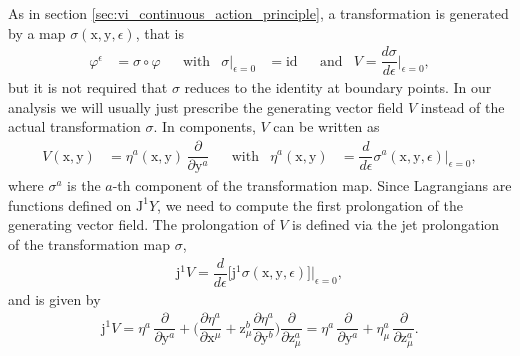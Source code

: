 \documentclass[12pt,a4paper,reqno]{article}
\begin{document}
As in section \ref{sec:vi_continuous_action_principle}, a transformation is generated by a map $\sigma ({\ensuremath{{\ensuremath{\mathrm{{x}}}}}}, {\ensuremath{{\ensuremath{\mathrm{{y}}}}}}, {\ensuremath{\epsilon}})$, that is
\begin{align}\label{eq:noether_continuous_transformation}
{\ensuremath{\varphi}}^{\ensuremath{\epsilon}} &= \sigma \circ {\ensuremath{\varphi}} &
& \text{with} &
\sigma \vert_{{\ensuremath{\epsilon}}=0} &= \mathrm{id} &
& \text{and} &
V = \dfrac{d\sigma}{d{\ensuremath{\epsilon}}} \bigg\vert_{{\ensuremath{\epsilon}}=0} ,
\end{align}
but it is not required that $\sigma$ reduces to the identity at boundary points.
In our analysis we will usually just prescribe the generating vector field $V$ instead of the actual transformation $\sigma$.
In components, $V$ can be written as
\begin{align}\label{eq:noether_continuous_vector_field}
V ({\ensuremath{{\ensuremath{\mathrm{{x}}}}}}, {\ensuremath{{\ensuremath{\mathrm{{y}}}}}}) &= \eta^{a} ({\ensuremath{{\ensuremath{\mathrm{{x}}}}}}, {\ensuremath{{\ensuremath{\mathrm{{y}}}}}}) \, \dfrac{\partial}{\partial {\ensuremath{{\ensuremath{\mathrm{{y}}}}}}^{a}} &
& \text{with} &
\eta^{a} ({\ensuremath{{\ensuremath{\mathrm{{x}}}}}}, {\ensuremath{{\ensuremath{\mathrm{{y}}}}}}) &= \dfrac{d}{d{\ensuremath{\epsilon}}} \sigma^{a} ({\ensuremath{{\ensuremath{\mathrm{{x}}}}}}, {\ensuremath{{\ensuremath{\mathrm{{y}}}}}}, {\ensuremath{\epsilon}}) \bigg\vert_{{\ensuremath{\epsilon}}=0} ,
\end{align}
where $\sigma^{a}$ is the $a$-th component of the transformation map. 
Since Lagrangians are functions defined on ${\ensuremath{\mathrm{J}}}^{1} Y$, we need to compute the first prolongation of the generating vector field.
The prolongation of $V$ is defined via the jet prolongation of the transformation map $\sigma$,
\begin{align}
{\ensuremath{\mathrm{j}}}^{1} V = \dfrac{d}{d{\ensuremath{\epsilon}}} \Big[ {\ensuremath{\mathrm{j}}}^{1} \sigma ({\ensuremath{{\ensuremath{\mathrm{{x}}}}}}, {\ensuremath{{\ensuremath{\mathrm{{y}}}}}}, {\ensuremath{\epsilon}}) \Big] \bigg\vert_{{\ensuremath{\epsilon}}=0} ,
\end{align}
and is given by
\begin{align}\label{eq:noether_continuous_vector_field_prolongation}
{\ensuremath{\mathrm{j}}}^{1} V
= \eta^{a} \, \dfrac{\partial}{\partial {\ensuremath{{\ensuremath{\mathrm{{y}}}}}}^{a}} + \bigg( \dfrac{\partial \eta^{a}}{\partial {\ensuremath{{\ensuremath{\mathrm{{x}}}}}}^{\mu}} + {\ensuremath{{\ensuremath{\mathrm{{z}}}}}}^{b}_{\mu} \dfrac{\partial \eta^{a}}{\partial {\ensuremath{{\ensuremath{\mathrm{{y}}}}}}^{b}} \bigg) \dfrac{\partial}{\partial {\ensuremath{{\ensuremath{\mathrm{{z}}}}}}^{a}_{\mu}}
= \eta^{a} \, \dfrac{\partial}{\partial {\ensuremath{{\ensuremath{\mathrm{{y}}}}}}^{a}} + \eta^{a}_{\mu} \, \dfrac{\partial}{\partial {\ensuremath{{\ensuremath{\mathrm{{z}}}}}}^{a}_{\mu}}
.
\end{align}
\end{document}
